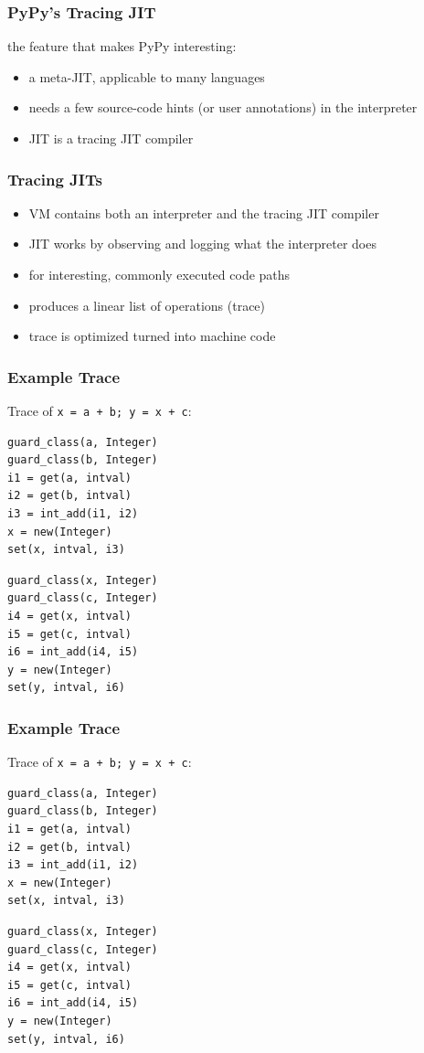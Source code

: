 \documentclass[utf8x]{beamer}
\begin{document}
\begin{frame}
  \frametitle{PyPy's Tracing JIT}
  the feature that makes PyPy interesting:
  \begin{itemize}
      \item a meta-JIT, applicable to many languages
      \item needs a few source-code hints (or user annotations) in the interpreter
      \item JIT is a tracing JIT compiler
  \end{itemize}
\end{frame}

\begin{frame}
  \frametitle{Tracing JITs}
  \begin{itemize}
      \item VM contains both an interpreter and the tracing JIT compiler
      \item JIT works by observing and logging what the interpreter does
      \item for interesting, commonly executed code paths
      \item produces a linear list of operations (trace)
      \item trace is optimized turned into machine code
  \end{itemize}
\end{frame}

\begin{frame}[containsverbatim]
  \frametitle{Example Trace}
  Trace of \texttt{x = a + b; y = x + c}:
\begin{verbatim}
guard_class(a, Integer)
guard_class(b, Integer)
i1 = get(a, intval)
i2 = get(b, intval)
i3 = int_add(i1, i2)
x = new(Integer)
set(x, intval, i3)
\end{verbatim}
\pause
\begin{verbatim}
guard_class(x, Integer)
guard_class(c, Integer)
i4 = get(x, intval)
i5 = get(c, intval)
i6 = int_add(i4, i5)
y = new(Integer)
set(y, intval, i6)
\end{verbatim}
\end{frame}

\begin{frame}[containsverbatim]
  \frametitle{Example Trace}
  Trace of \texttt{x = a + b; y = x + c}:
\begin{verbatim}
guard_class(a, Integer)
guard_class(b, Integer)
i1 = get(a, intval)
i2 = get(b, intval)
i3 = int_add(i1, i2)
x = new(Integer)
set(x, intval, i3)
\end{verbatim}
\begin{verbatim}
guard_class(x, Integer)
guard_class(c, Integer)
i4 = get(x, intval)
i5 = get(c, intval)
i6 = int_add(i4, i5)
y = new(Integer)
set(y, intval, i6)
\end{verbatim}
\end{frame}
\end{document}
